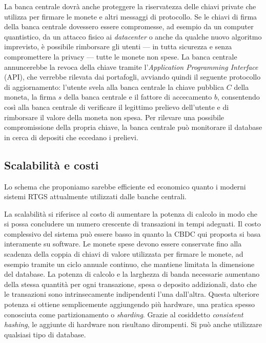 \documentclass{article}
\begin{document}
La banca centrale dovrà anche proteggere la riservatezza delle chiavi
private che utilizza per firmare le monete e altri messaggi di
protocollo. Se le chiavi di firma della banca centrale dovessero
essere compromesse, ad esempio da un computer quantistico, da un
attacco fisico ai \textit{datacenter} o anche da qualche nuovo algoritmo
imprevisto, è possibile rimborsare gli utenti --- in tutta sicurezza e
senza compromettere la privacy --- tutte le monete non spese. La banca
centrale annuncerebbe la revoca della chiave tramite l'\textit{Application
Programming Interface} (API), che verrebbe rilevata dai portafogli,
avviando quindi il seguente protocollo di aggiornamento: l'utente
svela alla banca centrale la chiave pubblica $C$ della moneta, la firma
$s$ della banca centrale e il fattore di accecamento $b$, consentendo così
alla banca centrale di verificare il legittimo prelievo dell'utente e
di rimborsare il valore della moneta non spesa. Per rilevare una
possibile compromissione della propria chiave, la banca centrale può
monitorare il database in cerca di depositi che eccedano i prelievi.

\subsection{Scalabilità e costi}\label{scalabilità-e-costi}

Lo schema che proponiamo sarebbe efficiente ed economico quanto i
moderni sistemi RTGS attualmente utilizzati dalle banche centrali.

La scalabilità si riferisce al costo di aumentare la potenza di
calcolo in modo che si possa concludere un numero crescente di
transazioni in tempi adeguati. Il costo complessivo del sistema può
essere basso in quanto la CBDC qui proposta si basa interamente su
software. Le monete spese devono essere conservate fino alla scadenza
della coppia di chiavi di valore utilizzata per firmare le monete, ad
esempio tramite un ciclo annuale continuo, che mantiene limitata la
dimensione del database. La potenza di calcolo e la larghezza di banda
necessarie aumentano della stessa quantità per ogni transazione, spesa
o deposito addizionali, dato che le transazioni sono intrinsecamente
indipendenti l'una dall'altra. Questa ulteriore potenza si ottiene
semplicemente aggiungendo più hardware, una pratica spesso conosciuta
come partizionamento o \textit{sharding}. Grazie al cosiddetto
\textit{consistent hashing}, le aggiunte di hardware non risultano
dirompenti. Si può anche utilizzare qualsiasi tipo di database.
\end{document}
